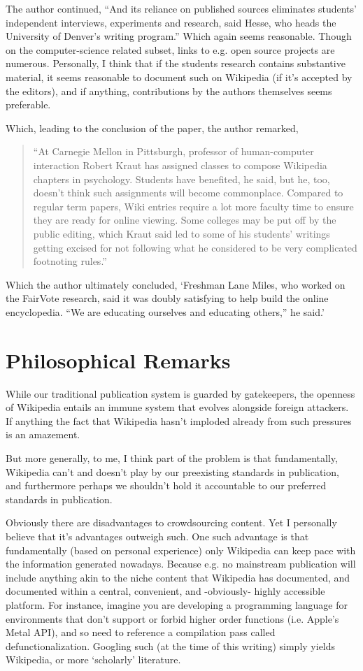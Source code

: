 The author continued, “And its reliance on published sources eliminates students’ independent interviews, experiments and research, said Hesse, who heads the University of Denver’s writing program.” Which again seems reasonable. Though on the computer-science related subset, links to e.g. open source projects are numerous. Personally, I think that if the students research contains substantive material, it seems reasonable to document such on Wikipedia (if it’s accepted by the editors), and if anything, contributions by the authors themselves seems preferable. 

Which, leading to the conclusion of the paper, the author remarked,

\begin{quotation}
“At Carnegie Mellon in Pittsburgh, professor of human-computer interaction Robert Kraut has assigned classes to compose Wikipedia chapters in psychology. Students have benefited, he said, but he, too, doesn’t think such assignments will become commonplace. Compared to regular term papers, Wiki entries require a lot more faculty time to ensure they are ready for online viewing. Some colleges may be put off by the public editing, which Kraut said led to some of his students’ writings getting excised for not following what he considered to be very complicated footnoting rules.”
\end{quotation}

Which the author ultimately concluded, ‘Freshman Lane Miles, who worked on the FairVote research, said it was doubly satisfying to help build the online encyclopedia. “We are educating ourselves and educating others,” he said.’

\section*{Philosophical Remarks}

While our traditional publication system is guarded by gatekeepers, the openness of Wikipedia entails an immune system that evolves alongside foreign attackers. If anything the fact that Wikipedia hasn’t imploded already from such pressures is an amazement. 

But more generally, to me, I think part of the problem is that fundamentally, Wikipedia can’t and doesn’t play by our preexisting standards in publication, and furthermore perhaps we shouldn’t hold it accountable to our preferred standards in publication. 

Obviously there are disadvantages to crowdsourcing content. Yet I personally believe that it’s advantages outweigh such. One such advantage is that fundamentally (based on personal experience) only Wikipedia can keep pace with the information generated nowadays. Because e.g. no mainstream publication will include anything akin to the niche content that Wikipedia has documented, and documented within a central, convenient, and -obviously- highly accessible platform. For instance, imagine you are developing a programming language for environments that don’t support or forbid higher order functions (i.e. Apple’s Metal API), and so need to reference a compilation pass called defunctionalization. Googling such (at the time of this writing) simply yields Wikipedia, or more ‘scholarly’ literature.

